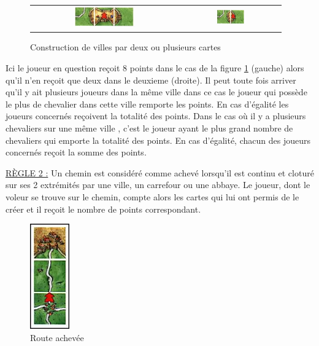 \documentclass[12pt]{article}
\begin{document}
\begin{itemize}
\begin{figure}[!h]
\begin{center}
\begin{tabular}{cc}
   \includegraphics[width=0.42\textwidth]{ville-8-pt.png} &
   \includegraphics[width=0.3\textwidth]{ville-2-pt.png} \\
\end{tabular}
\end{center}
\caption{Construction de villes par deux ou plusieurs cartes } \label{figure3}
\end{figure}

\textsf{Ici le joueur en question reçoit 8 points dans le cas de la figure \ref{figure3} (gauche) alors qu'il n'en reçoit que deux dans le deuxieme (droite).}\newline
Il peut toute fois arriver qu'il y ait plusieurs joueurs dans la même ville dans ce cas le joueur qui possède le plus de chevalier dans cette ville remporte les points. En cas d'égalité les joueurs concernés reçoivent la totalité des points.
Dans le cas où il y a plusieurs chevaliers sur une même ville , c'est le joueur ayant le plus grand nombre de chevaliers qui emporte la totalité des points. En cas d'égalité, chacun des joueurs concernés reçoit la somme des points. \newline

\underline{RÈGLE 2 :} Un chemin est considéré comme achevé lorsqu'il est continu et cloturé sur ses 2 extrémités par une ville, un carrefour ou une abbaye. Le joueur, dont le voleur se trouve sur le chemin, compte alors les cartes qui lui ont permis de le créer et il reçoit le nombre de points correspondant.\newline

\begin{figure}[!h]
\begin{center}
\includegraphics[width=0.15\textwidth]{route_achevee.jpg}
\end{center}
\caption{Route achevée} \label{4}
\end{figure}


\end{itemize}
\end{document}
